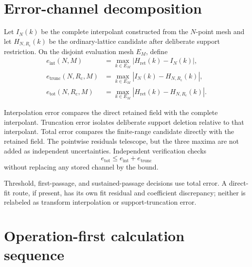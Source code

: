 \documentclass[11pt]{article}
\newcommand{\Rc}{R_{\mathrm{c}}}
\newcommand{\Hret}{H_{\mathrm{ret}}}
\begin{document}
\section{Error-channel decomposition}

Let $I_N(k)$ be the complete interpolant constructed from the $N$-point mesh and let
$H_{N,\Rc}(k)$ be the ordinary-lattice candidate after deliberate support restriction.
On the disjoint evaluation mesh $E_M$, define
\begin{align}
  e_{\mathrm{int}}(N,M)
  &=\max_{k\in E_M}|\Hret(k)-I_N(k)|,\\
  e_{\mathrm{trunc}}(N,\Rc,M)
  &=\max_{k\in E_M}|I_N(k)-H_{N,\Rc}(k)|,\\
  e_{\mathrm{tot}}(N,\Rc,M)
  &=\max_{k\in E_M}|\Hret(k)-H_{N,\Rc}(k)|.
\end{align}

Interpolation error compares the direct retained field with the complete interpolant.
Truncation error isolates deliberate support deletion relative to that interpolant.
Total error compares the finite-range candidate directly with the retained field.  The
pointwise residuals telescope, but the three maxima are not added as independent
uncertainties.  Independent verification checks
\begin{equation}
  e_{\mathrm{tot}}\le e_{\mathrm{int}}+e_{\mathrm{trunc}}
\end{equation}
without replacing any stored channel by the bound.

Threshold, first-passage, and sustained-passage decisions use total error.  A direct-fit
route, if present, has its own fit residual and coefficient discrepancy; neither is
relabeled as transform interpolation or support-truncation error.

\section{Operation-first calculation sequence}
\end{document}
